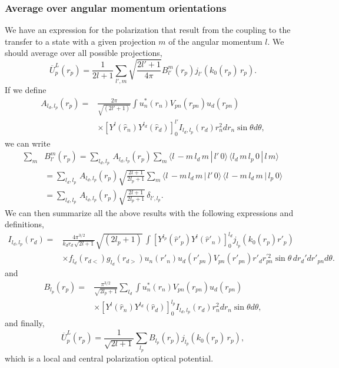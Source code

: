 \documentclass[a4paper,11pt]{article}
\begin{document}
\subsubsection{Average over angular momentum orientations} 
We have an expression for the polarization that result from the coupling to the transfer to a state with a given projection $m$ of the angular momentum $l$. We should average over all possible projections, 
 \begin{equation}\label{eq79}
 \overline U^L_p(r_p)=\frac{1}{2l+1}\sum_{l',m}\sqrt{\frac{2l'+1}{4\pi}} B^m_{l'}(r_p)j_{l'}(k_0(r_p) \,r_p).
 \end{equation}
 If we define 
  \begin{align}\label{eq81}
  \nonumber A_{l_d,l_p}(r_p)=&\frac{2\pi}{\sqrt{(2l'+1)}}\int u_n^*(r_n)V_{pn}(r_{pn})u_d(r_{pn})\\
  &\times  \left[Y^{l}(\hat r_n)Y^{l_d}(\hat r_d)\right]^{l'}_0 I_{l_d,l_p}(r_d)r^2_n d r_n \sin\theta d\theta,
  \end{align}
we can write
\begin{align}\label{eq80}
\nonumber    \sum_m &B^m_{l'}(r_p)=\sum_{l_d,l_p}\,A_{l_d,l_p}(r_p)\sum_m \langle l\,-m\,l_d\,m\,|\,l'\,0\rangle\,\langle l_d\,m\,l_p\,0\,|\,l\,m\rangle \\
&=\sum_{l_d,l_p}\,A_{l_d,l_p}(r_p)\sqrt{\frac{2l+1}{2l_p+1}}\sum_m \langle l\,-m\,l_d\,m\,|\,l'\,0\rangle\,\langle l\,-m\,l_d\,m\,|\,l_p\,0\rangle\\
&=\sum_{l_d,l_p}\,A_{l_d,l_p}(r_p)\sqrt{\frac{2l+1}{2l_p+1}}\,\delta_{l',l_p}.
\end{align}
We can then summarize all the above results with the following expressions and definitions,
 \begin{align}\label{eq83}
\nonumber I_{l_d,l_p}(r_d)=&\frac{4\pi^{3/2}}{k_dr_d\,\sqrt{2l+1}}\sqrt{(2l_p+1)}\,  \int  \left[Y^{l_p}(\hat r'_p)Y^{l}(\hat r'_n)\right]^{l_d}_0j_{l_p}(k_0(r_p) r'_p)\\
&\times f_{l_d}(r_{d<})g_{l_d}(r_{d>})u_n(r'_n)u_d(r'_{pn}) V_{pn}(r'_{pn}) r'_dr_{pn}^{'2}\sin\theta\, d r_d'dr'_{pn}d\theta.     
 \end{align}
 and
 \begin{align}\label{eq82}
 \nonumber B_{l_p}(r_p)=&\frac{\pi^{3/2}}{\sqrt{2l_p+1}}\sum_{l_d}\int u_n^*(r_n)V_{pn}(r_{pn})u_d(r_{pn})\\
 &\times  \left[Y^{l}(\hat r_n)Y^{l_d}(\hat r_d)\right]^{l_p}_0 I_{l_d,l_p}(r_d)r^2_n d r_n \sin\theta d\theta,
 \end{align}
 and finally,
 \begin{equation}\label{eq84}
 \overline U^L_p(r_p)=\frac{1}{\sqrt{2l+1}}\sum_{l_p} B_{l_p}(r_p)j_{l_p}(k_0(r_p) \,r_p),
 \end{equation} 
which is a local and central polarization optical potential.
\end{document}
